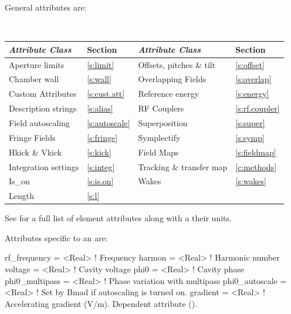{General  attributes are:
\begin{center}
\tt
\begin{tabular}{llll} \toprule
  {\sl Attribute Class}      & Section            & {\sl Attribute Class}      & Section            \\ \midrule
  Aperture limits            & \ref{s:limit}      & Offsets, pitches \& tilt   & \ref{s:offset}     \\
  Chamber wall               & \ref{s:wall}       & Overlapping Fields         & \ref{s:overlap}    \\
  Custom Attributes          & \ref{s:cust.att}   & Reference energy           & \ref{s:energy}     \\ 
  Description strings        & \ref{s:alias}      & RF Couplers                & \ref{s:rf.coupler} \\
  Field autoscaling          & \ref{s:autoscale}  & Superposition              & \ref{s:super}      \\
  Fringe Fields              & \ref{s:fringe}     & Symplectify                & \ref{s:symp}       \\
  Hkick \& Vkick             & \ref{s:kick}       & Field Maps                 & \ref{s:fieldmap}   \\
  Integration settings       & \ref{s:integ}      & Tracking \& transfer map   & \ref{c:methods}    \\
  Is_on                      & \ref{s:is.on}      & Wakes                      & \ref{s:wakes}      \\
  Length                     & \ref{s:l}          &                            &                    \\
  \bottomrule
\end{tabular}
\end{center}
\toffset
See  for a full list of element attributes along with a their units.

Attributes specific to an  are:
\begin{example}
  rf_frequency    = <Real>    ! Frequency
  harmon          = <Real>    ! Harmonic number
  voltage         = <Real>    ! Cavity voltage
  phi0            = <Real>    ! Cavity phase
  phi0_multipass  = <Real>    ! Phase variation with multipass
  phi0_autoscale  = <Real>    ! Set by Bmad if autoscaling is turned on.
  gradient        = <Real>    ! Accelerating gradient (V/m). Dependent attribute ().
\end{example}

}

